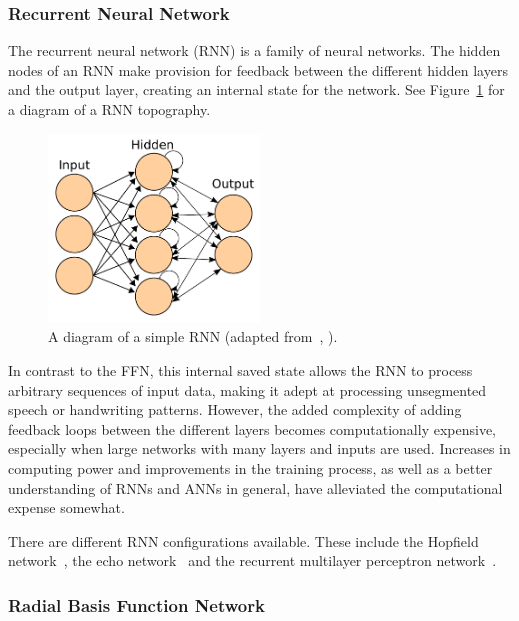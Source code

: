 \subsubsection*{Recurrent Neural Network}

The recurrent neural network (RNN) is a family of neural networks. The hidden nodes of an RNN make provision for feedback between the different hidden layers and the output layer, creating an internal state for the network. See Figure~\ref{fig:chap2-rnn-diagram} for a diagram of a RNN topography.

\begin{figure}
 \centering
 \includegraphics[width=0.5\textwidth]{figures/chapter2/rnn_diagram}
 \caption[Diagram of a simple RNN.]{A diagram of a simple RNN (adapted from~\citeauthor{ann-wiki-pic}, \citeyear{ann-wiki-pic}).}
\label{fig:chap2-rnn-diagram}
\end{figure}

In contrast to the FFN, this internal saved state allows the RNN to process arbitrary sequences of input data, making it adept at processing unsegmented speech or handwriting patterns. However, the added complexity of adding feedback loops between the different layers becomes computationally expensive, especially when large networks with many layers and inputs are used. Increases in computing power and improvements in the training process, as well as a better understanding of RNNs and ANNs in general, have alleviated the computational expense somewhat.

There are different RNN configurations available. These include the Hopfield network~\citep{hopfield1982neural}, the echo network~\citep{jaeger2001echo} and the recurrent multilayer perceptron network~\citep{tutschku1995recurrent}.

\subsubsection*{Radial Basis Function Network}

